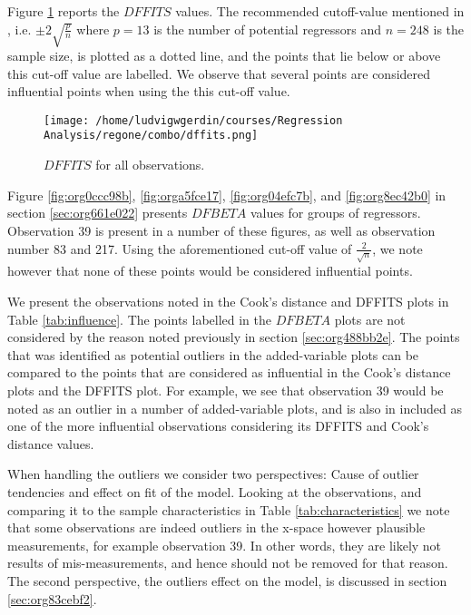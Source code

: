 \documentclass[11pt]{article}
\begin{document}
Figure \ref{fig:orga0e2a3a} reports the \(DFFITS\) values. 
The recommended cutoff-value mentioned in \cite{Montgomery2012}, i.e. \(\pm 2\sqrt{\frac{p}{n}}\)
where \(p = 13\) is the number of potential regressors and \(n = 248\) is the sample size, is 
plotted as a dotted line, and the points that lie below or above this cut-off value are labelled.
We observe that several points are considered influential points when using the this cut-off value.

\begin{figure}[h]
\centering
\texttt{[image: /home/ludvigwgerdin/courses/Regression Analysis/regone/combo/dffits.png]}
\caption{\label{fig:orga0e2a3a}
\(DFFITS\) for all observations.}
\end{figure}

Figure \ref{fig:org0ccc98b}, \ref{fig:orga5fce17}, \ref{fig:org04efc7b}, and
\ref{fig:org8ec42b0} in section \ref{sec:org661e022} presents \(DFBETA\) values for groups of regressors. 
Observation 39 is present in a number of these figures, as well as observation number 83 and 217. 
Using the aforementioned cut-off value of \(\frac{2}{\sqrt{n}}\), we note however that none of these points
would be considered influential points.

We present the observations noted in the Cook's distance and DFFITS plots in Table \ref{tab:influence}.
The points labelled in the \(DFBETA\) plots are not considered by the reason noted previously 
in section \ref{sec:org488bb2e}. The points that was identified as potential outliers in the added-variable
plots can be compared to the points that are considered as influential in the Cook's distance plots
and the DFFITS plot. For example, we see that observation 39 would be noted as an outlier in a number of 
added-variable plots, and is also in included as one of the more influential observations considering 
its DFFITS and Cook's distance values.

When handling the outliers we consider two perspectives: Cause of outlier tendencies and effect on fit of 
the model. Looking at the observations, and comparing it to the sample characteristics in Table \ref{tab:characteristics}
we note that some observations are indeed outliers in the x-space however 
plausible measurements, for example observation 39. In other words, they are likely not results
of mis-measurements, and hence should not be removed for that reason. The second perspective, the outliers 
effect on the model, is discussed in section \ref{sec:org83cebf2}.
\end{document}
